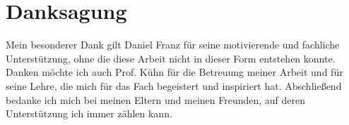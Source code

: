 \section*{Danksagung}


Mein besonderer Dank gilt Daniel Franz für seine motivierende und fachliche Unterstützung, ohne die diese Arbeit nicht in dieser Form entstehen konnte. Danken möchte ich auch Prof. Kühn für die Betreuung meiner Arbeit und für seine Lehre, die mich für das Fach begeistert und inspiriert hat. Abschließend bedanke ich mich bei meinen Eltern und meinen Freunden, auf deren Unterstützung ich immer zählen kann.